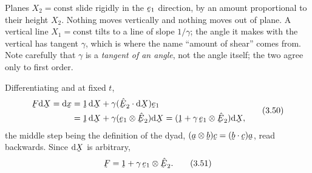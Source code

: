 \begin{remark}\label{rem:read349}
Planes $X_{2}=\text{const}$ slide rigidly in the $\be_{1}$ direction, by an
amount proportional to their height $X_{2}$. Nothing moves vertically and
nothing moves out of plane. A vertical line $X_{1}=\text{const}$ tilts to
a line of slope $1/\gamma$; the angle it makes with the vertical has
tangent $\gamma$, which is where the name ``amount of shear'' comes from.
Note carefully that $\gamma$ is a \emph{tangent of an angle}, not the angle
itself; the two agree only to first order.
\end{remark}

Differentiating  and  at fixed $t$,
\begin{equation}
\begin{aligned}
   \bF\dl\bX=\dl\bx
   &=\shift\,\dl\bX+\gamma(\ip{\hbE_{2}}{\dl\bX})\be_{1}\\
   &=\shift\,\dl\bX+\gamma(\be_{1}\otimes\hbE_{2})\dl\bX
    =(\shift+\gamma\,\be_{1}\otimes\hbE_{2})\dl\bX,
\end{aligned}
   \tag{3.50}\label{eq:3.50}
\end{equation}
the middle step being the definition of the dyad,
$(\ba\otimes\bb)\bc=(\ip\bb\bc)\ba$, read backwards. Since $\dl\bX$ is
arbitrary,
\begin{equation}
   \bF=\shift+\gamma\,\be_{1}\otimes\hbE_{2}.
   \tag{3.51}\label{eq:3.51}
\end{equation}

